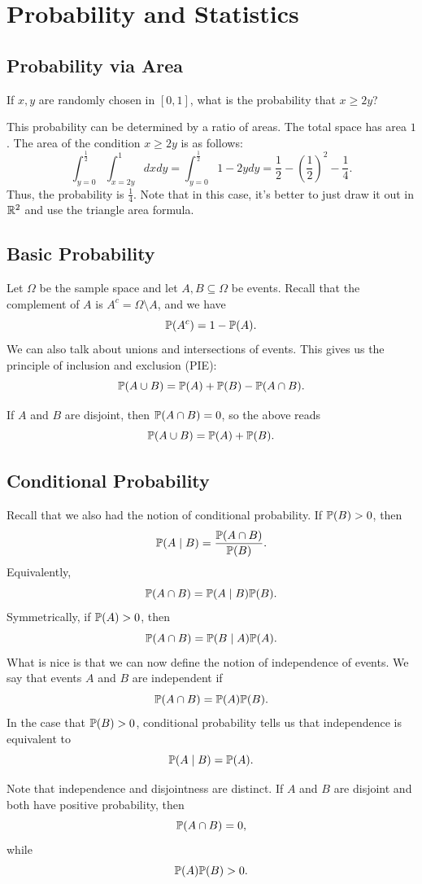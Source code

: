 \section{Probability and Statistics}

\subsection{Probability via Area}

\begin{exercise}
If $x,y$ are randomly chosen in $[0, 1]$, what is the probability that
$x \geq 2y$?
\end{exercise}
\begin{solution}
This probability can be determined by a ratio of areas. The total space has area $1$.
The area of the condition $x \geq 2y$ is as follows:
\[
\int_{y = 0}^{\frac{1}{2}} \int_{x = 2y}^1 dx dy =
\int_{y = 0}^{\frac{1}{2}} 1 - 2y dy =
\frac{1}{2} - \left(\frac{1}{2}\right)^2 - \frac{1}{4}.
\]
Thus, the probability is $\frac{1}{4}$. Note that in this case, it's better to just 
draw it out in $\R^2$ and use the triangle area formula.
\end{solution}


\subsection{Basic Probability}

Let $\Omega$ be the sample space and let $A,B \subseteq \Omega$ be events.
Recall that the complement of $A$ is $A^c = \Omega \setminus A$, and we have 
\[
\P(A^c)=1-\P(A).
\]
We can also talk about unions and intersections of events. This gives us the 
principle of inclusion and exclusion (PIE):
\[
\P(A\cup B)=\P(A)+\P(B)-\P(A\cap B).
\]
\begin{remark}
If $A$ and $B$ are disjoint, then $\P(A\cap B)=0$, so the above reads
\[
\P(A\cup B)=\P(A)+\P(B).
\]
\end{remark}

\subsection{Conditional Probability}

Recall that we also had the notion of conditional probability.
If $\P(B)>0$, then
\[
\P(A\mid B)=
\frac{\Pp(A\cap B)}{\Pp(B)}.
\]
Equivalently,
\[
\Pp(A\cap B)= \Pp(A\mid B)\Pp(B).
\]
Symmetrically, if $\P(A) > 0$, then
\[
\Pp(A\cap B) = \Pp(B\mid A)\Pp(A).
\]
What is nice is that we can now define the notion of independence of events.
We say that events $A$ and $B$ are independent if
\[
\Pp(A\cap B)=\Pp(A)\Pp(B).
\]
In the case that $\P(B) > 0$, conditional probability tells us that independence
is equivalent to
\[
\P(A\mid B)=\P(A).
\]
\begin{remark}
Note that independence and disjointness are distinct.
If $A$ and $B$ are disjoint and both have positive probability, then
\[
\Pp(A\cap B)=0,
\]
while
\[
\Pp(A)\Pp(B)>0.
\]
\end{remark}


